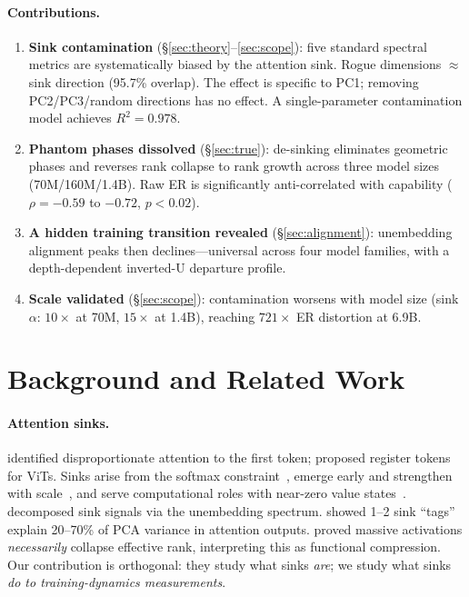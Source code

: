 \documentclass[11pt]{article}
\begin{document}
\paragraph{Contributions.}
\begin{enumerate}[leftmargin=1.5em,itemsep=2pt,topsep=3pt]
    \item \textbf{Sink contamination} (\S\ref{sec:theory}--\ref{sec:scope}): five standard spectral metrics are systematically biased by the attention sink. Rogue dimensions $\approx$ sink direction (95.7\% overlap). The effect is specific to PC1; removing PC2/PC3/random directions has no effect. A single-parameter contamination model achieves $R^2 = 0.978$.
    \item \textbf{Phantom phases dissolved} (\S\ref{sec:true}): de-sinking eliminates geometric phases and reverses rank collapse to rank growth across three model sizes (70M/160M/1.4B). Raw ER is significantly anti-correlated with capability ($\rho = -0.59$ to $-0.72$, $p < 0.02$).
    \item \textbf{A hidden training transition revealed} (\S\ref{sec:alignment}): unembedding alignment peaks then declines---universal across four model families, with a depth-dependent inverted-U departure profile.
    \item \textbf{Scale validated} (\S\ref{sec:scope}): contamination worsens with model size (sink $\alpha$: $10\times$ at 70M, $15\times$ at 1.4B), reaching $721\times$ ER distortion at 6.9B.
\end{enumerate}

\section{Background and Related Work}\label{sec:related}

\paragraph{Attention sinks.}
\citet{xiao2024efficient} identified disproportionate attention to the first token; \citet{darcet2024vision} proposed register tokens for ViTs.
Sinks arise from the softmax constraint~\citep{sun2024massive}, emerge early and strengthen with scale~\citep{gu2025attention}, and serve computational roles with near-zero value states~\citep{barbero2025why}.
\citet{cancedda2024spectral} decomposed sink signals via the unembedding spectrum.
\citet{zhang2025catch} showed 1--2 sink ``tags'' explain 20--70\% of PCA variance in attention outputs.
\citet{queipodellano2025sinks} proved massive activations \emph{necessarily} collapse effective rank, interpreting this as functional compression.
Our contribution is orthogonal: they study what sinks \emph{are}; we study what sinks \emph{do to training-dynamics measurements}.
\end{document}

